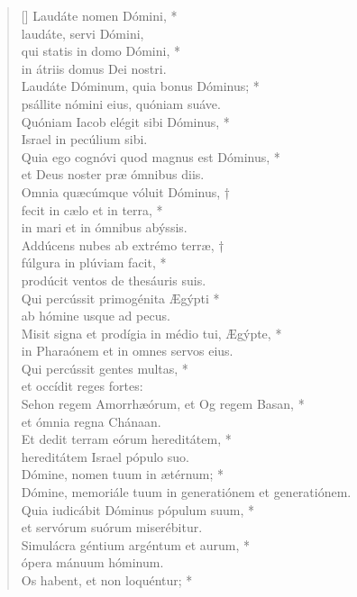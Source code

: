 \begin{verse}[\versewidth]
Laudáte nomen Dómini, *\\
laudáte, servi Dómini,\\
\vin qui statis in domo Dómini, *\\
\vin in átriis domus Dei nostri.\\
Laudáte Dóminum, quia bonus Dóminus; *\\
psállite nómini eius, quóniam suáve.\\
\vin Quóniam Iacob elégit sibi Dóminus, *\\
\vin Israel in pecúlium sibi.\\
Quia ego cognóvi quod magnus est Dóminus, *\\
et Deus noster præ ómnibus diis.\\
\vin Omnia quæcúmque vóluit Dóminus, †\\
\vin fecit in cælo et in terra, *\\
\vin in mari et in ómnibus abýssis.\\
Addúcens nubes ab extrémo terræ, †\\
fúlgura in plúviam facit, *\\
prodúcit ventos de thesáuris suis.\\
\vin Qui percússit primogénita Ægýpti *\\
\vin ab hómine usque ad pecus.\\
Misit signa et prodígia in médio tui, Ægýpte, *\\
in Pharaónem et in omnes servos eius.\\
\vin Qui percússit gentes multas, *\\
\vin et occídit reges fortes:\\
Sehon regem Amorrhæórum, et Og regem Basan, *\\
et ómnia regna Chánaan.\\
\vin Et dedit terram eórum hereditátem, *\\
\vin hereditátem Israel pópulo suo.\\
Dómine, nomen tuum in ætérnum; *\\
Dómine, memoriále tuum in generatiónem et generatiónem.\\
\vin Quia iudicábit Dóminus pópulum suum, *\\
\vin et servórum suórum miserébitur.\\
Simulácra géntium argéntum et aurum, *\\
ópera mánuum hóminum.\\
\vin Os habent, et non loquéntur; *\\

\end{verse}

